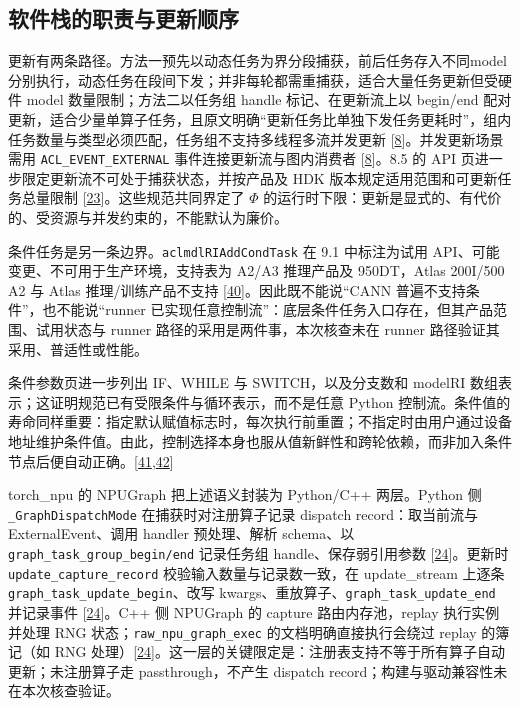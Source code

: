 \documentclass[
  UTF8,
  zihao=5]{ctexart}
\begin{document}
\hypertarget{ux8f6fux4ef6ux6808ux7684ux804cux8d23ux4e0eux66f4ux65b0ux987aux5e8f}{%
\subsection*{软件栈的职责与更新顺序}\label{ux8f6fux4ef6ux6808ux7684ux804cux8d23ux4e0eux66f4ux65b0ux987aux5e8f}}

更新有两条路径。方法一预先以动态任务为界分段捕获，前后任务存入不同model分别执行，动态任务在段间下发；并非每轮都需重捕获，适合大量任务更新但受硬件
model 数量限制；方法二以任务组 handle 标记、在更新流上以 begin/end
配对更新，适合少量单算子任务，且原文明确``更新任务比单独下发任务更耗时''，组内任务数量与类型必须匹配，任务组不支持多线程多流并发更新
{[}\protect\hyperlink{ref-cann910update}{8}{]}。并发更新场景需用
\texttt{ACL\_EVENT\_EXTERNAL} 事件连接更新流与图内消费者
{[}\protect\hyperlink{ref-cann910update}{8}{]}。8.5 的 API
页进一步限定更新流不可处于捕获状态，并按产品及 HDK
版本规定适用范围和可更新任务总量限制
{[}\protect\hyperlink{ref-cann850updateapi}{23}{]}。这些规范共同界定了
\(\Phi\)
的运行时下限：更新是显式的、有代价的、受资源与并发约束的，不能默认为廉价。

条件任务是另一条边界。\texttt{aclmdlRIAddCondTask} 在 9.1 中标注为试用
API、可能变更、不可用于生产环境，支持表为 A2/A3 推理产品及 950DT，Atlas
200I/500 A2 与 Atlas 推理/训练产品不支持
{[}\protect\hyperlink{ref-cann910conditional}{40}{]}。因此既不能说``CANN
普遍不支持条件''，也不能说``runner
已实现任意控制流''：底层条件任务入口存在，但其产品范围、试用状态与
runner 路径的采用是两件事，本次核查未在 runner
路径验证其采用、普适性或性能。

条件参数页进一步列出 IF、WHILE 与 SWITCH，以及分支数和 modelRI
数组表示；这证明规范已有受限条件与循环表示，而不是任意 Python
控制流。条件值的寿命同样重要：指定默认赋值标志时，每次执行前重置；不指定时由用户通过设备地址维护条件值。由此，控制选择本身也服从值新鲜性和跨轮依赖，而非加入条件节点后便自动正确。{[}\protect\hyperlink{ref-audit_cann_cond_params}{41},\protect\hyperlink{ref-audit_cann_cond_create}{42}{]}

torch\_npu 的 NPUGraph 把上述语义封装为 Python/C++ 两层。Python 侧
\texttt{\_GraphDispatchMode} 在捕获时对注册算子记录 dispatch
record：取当前流与 ExternalEvent、调用 handler 预处理、解析 schema、以
\texttt{graph\_task\_group\_begin/end} 记录任务组 handle、保存弱引用参数
{[}\protect\hyperlink{ref-torchnpu2026graphs}{24}{]}。更新时
\texttt{update\_capture\_record} 校验输入数量与记录数一致，在
update\_stream 上逐条 \texttt{graph\_task\_update\_begin}、改写
kwargs、重放算子、\texttt{graph\_task\_update\_end} 并记录事件
{[}\protect\hyperlink{ref-torchnpu2026graphs}{24}{]}。C++ 侧 NPUGraph 的
capture 路由内存池，replay 执行实例并处理 RNG
状态；\texttt{raw\_npu\_graph\_exec} 的文档明确直接执行会绕过 replay
的簿记（如 RNG
处理）{[}\protect\hyperlink{ref-torchnpu2026graphs}{24}{]}。这一层的关键限定是：注册表支持不等于所有算子自动更新；未注册算子走
passthrough，不产生 dispatch record；构建与驱动兼容性未在本次核查验证。
\end{document}
